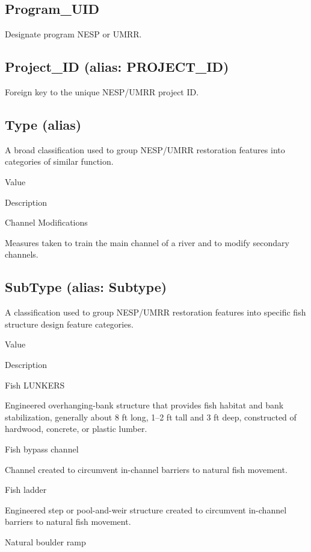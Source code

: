 \documentclass[
  letterpaper,
  DIV=11,
  numbers=noendperiod]{scrreprt}
\begin{document}
\subsection{Program\_UID}\label{program_uid-3}

Designate program NESP or UMRR.

\subsection{Project\_ID (alias:
PROJECT\_ID)}\label{project_id-alias-project_id-3}

Foreign key to the unique NESP/UMRR project ID.

\subsection{Type (alias)}\label{type-alias-3}

A broad classification used to group NESP/UMRR restoration features into
categories of similar function.

Value

Description

Channel Modifications

Measures taken to train the main channel of a river and to modify
secondary channels.

\subsection{SubType (alias: Subtype)}\label{subtype-alias-subtype-3}

A classification used to group NESP/UMRR restoration features into
specific fish structure design feature categories.

Value

Description

Fish LUNKERS

Engineered overhanging-bank structure that provides fish habitat and
bank stabilization, generally about 8 ft long, 1--2 ft tall and 3 ft
deep, constructed of hardwood, concrete, or plastic lumber.

Fish bypass channel

Channel created to circumvent in-channel barriers to natural fish
movement.

Fish ladder

Engineered step or pool-and-weir structure created to circumvent
in-channel barriers to natural fish movement.

Natural boulder ramp
\end{document}
